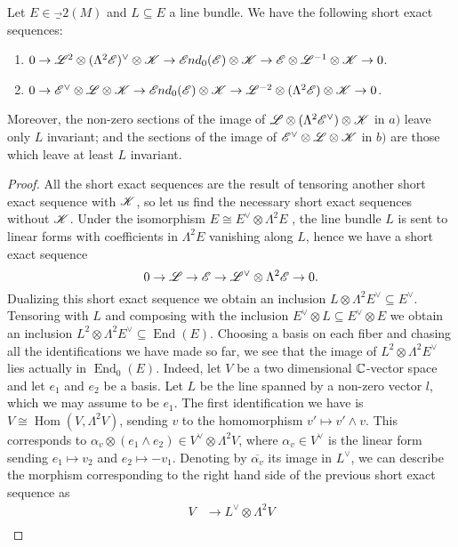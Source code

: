 \documentclass[A4paper, 12pt, british, reqno]{amsart}
\DeclareMathOperator{\Hom}{Hom}
\DeclareMathOperator{\End}{End}
\newcommand{\ot}{\otimes}
\newcommand{\dual}{^{\vee}}
\newcommand{\1}{\mathbbm{1}}
\begin{document}
{\color{gray}
\begin{lm}\label{lm:linearalgebra}
    Let $E\in \Vec_{2}(M)$ and $L\subseteq E$ a line bundle.
    We have the following short exact sequences:
    \begin{enumerate}[label=\alph*)]
	\item $0\to \L^{2}\ot (\Lambda^{2}\E)\dual \ot \sK \to \sEnd_{0}(\E)\ot \sK\to \E\ot \L^{-1}\ot \sK\to 0$.
	\item $0\to \E\dual \ot \L\ot \sK\to \sEnd_{0}(\E)\ot \sK \to \L^{-2}\ot (\Lambda^{2}\E)\ot \sK\to 0$.
    \end{enumerate}
    Moreover, the non-zero sections of the image of $\L\ot (\Lambda^{2}\E\dual)\ot \sK$ in $a)$ leave only $L$ invariant; and the sections of the image of $\E\dual\ot \L\ot \sK$ in $b)$ are those which leave at least $L$ invariant.
    \begin{proof}
	All the short exact sequences are the result of tensoring another short exact sequence with $\mathscr{K}$, so let us find the necessary short exact sequences without $\mathscr{K}$.
	Under the isomorphism $E\cong E\dual \ot \Lambda^{2}E$ \cite[Exercise II.5.16]{har77}, the line bundle $L$ is sent to linear forms with coefficients in $\Lambda^{2}E$ vanishing along $L$, hence we have a short exact sequence
	\[ 0\to \L\to \E\to \L\dual \ot \Lambda^{2}\E\to 0. \]
	Dualizing this short exact sequence we obtain an inclusion $L\ot \Lambda^{2}E\dual \subseteq E\dual$.
	Tensoring with $L$ and composing with the inclusion $E\dual\ot L\subseteq E\dual \ot E$ we obtain an inclusion $L^{2}\ot \Lambda^{2}E\dual \subseteq \End(E)$.
	Choosing a basis on each fiber and chasing all the identifications we have made so far, we see that the image of $L^{2}\ot \Lambda^{2}E\dual$ lies actually in $\End_{0}(E)$.
	Indeed, let $V$ be a two dimensional $\mathbb{C}$-vector space and let $e_{1}$ and $e_{2}$ be a basis.
	Let $L$ be the line spanned by a non-zero vector $l$, which we may assume to be $e_{1}$.
	The first identification we have is $V\cong \Hom(V,\Lambda^{2}V)$, sending $v$ to the homomorphism $v'\mapsto v'\wedge v$.
	This corresponds to $\alpha_{v}\ot (e_{1}\wedge e_{2})\in V\dual\ot\Lambda^{2}V$, where $\alpha_{v}\in V\dual$ is the linear form sending $e_{1}\mapsto v_{2}$ and $e_{2}\mapsto -v_{1}$.
	Denoting by $\overline{\alpha_{v}}$ its image in $L\dual$, we can describe the morphism corresponding to the right hand side of the previous short exact sequence as
	\begin{align*}
	    V &\longrightarrow L\dual \ot \Lambda^{2}V \\

\end{align*}
\end{proof}
\end{lm}}
\end{document}
